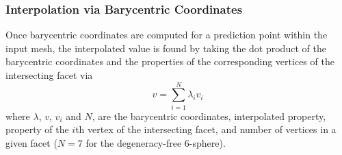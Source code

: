 \documentclass[preprint,12pt]{elsarticle}
\begin{document}
\subsubsection{Interpolation via Barycentric Coordinates}
\label{sec:methods:bary:interp}

Once barycentric coordinates are computed for a prediction point within the input mesh, the interpolated value is found by taking the dot product of the barycentric coordinates and the properties of the corresponding vertices of the intersecting facet via
\begin{equation}
v=\underset{i=1}{\overset{N}{\sum }}\lambda _i v_i
\end{equation}
where $\lambda$, $v$, $v_i$ and $N$, are the barycentric coordinates, interpolated property, property of the $i$th vertex of the intersecting facet, and number of vertices in a given facet ($N = 7$ for the degeneracy-free 6-sphere).
    


\end{document}
